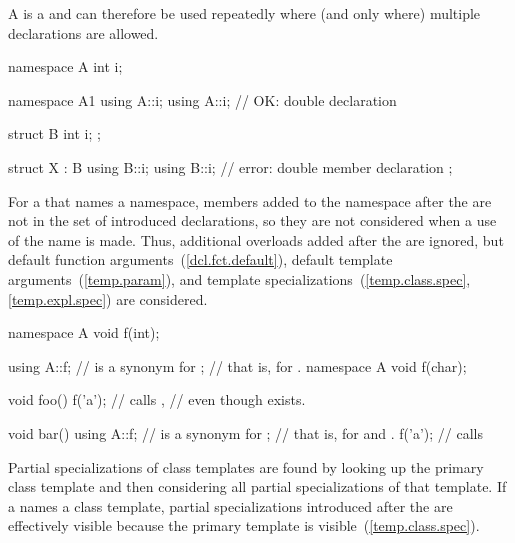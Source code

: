 \pnum
A  is a  and can
therefore be used repeatedly where (and only where) multiple
declarations are allowed.
\begin{example}

\begin{codeblock}
namespace A {
  int i;
}

namespace A1 {
  using A::i;
  using A::i;       // OK: double declaration
}

struct B {
  int i;
};

struct X : B {
  using B::i;
  using B::i;       // error: double member declaration
};
\end{codeblock}
\end{example}

\pnum
\begin{note}
For a  that names a namespace,
members added to the namespace after the 
are not in the set of introduced declarations, so they are not
considered when a use of the name is made. Thus, additional
overloads added after the  are ignored, but
default function arguments~(\ref{dcl.fct.default}), default template
arguments~(\ref{temp.param}), and template specializations~(\ref{temp.class.spec},
\ref{temp.expl.spec}) are considered. \end{note}
\begin{example}

\begin{codeblock}
namespace A {
  void f(int);
}

using A::f;         //  is a synonym for ;
                    // that is, for .
namespace A {
  void f(char);
}

void foo() {
  f('a');           // calls ,
}                   // even though  exists.

void bar() {
  using A::f;       //  is a synonym for ;
                    // that is, for  and .
  f('a');           // calls 
}
\end{codeblock}
\end{example}

\pnum
\begin{note}
Partial specializations of class templates are found by looking up the
primary class template and then considering all partial specializations
of that template. If a  names a class
template, partial specializations introduced after the
 are effectively visible because the primary
template is visible~(\ref{temp.class.spec}).
\end{note}

